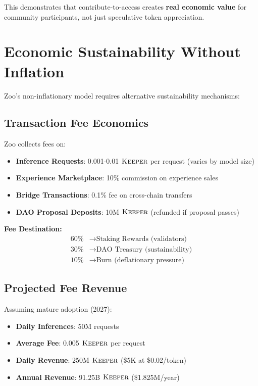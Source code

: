 \documentclass[11pt,letterpaper]{article}
\theoremstyle{definition}
\theoremstyle{remark}
\newcommand{\KEEPER}{\textsc{Keeper}}
\begin{document}
This demonstrates that contribute-to-access creates \textbf{real economic value} for community participants, not just speculative token appreciation.

\section{Economic Sustainability Without Inflation}

Zoo's non-inflationary model requires alternative sustainability mechanisms:

\subsection{Transaction Fee Economics}

Zoo collects fees on:
\begin{itemize}
\item \textbf{Inference Requests}: 0.001-0.01 $\KEEPER$ per request (varies by model size)
\item \textbf{Experience Marketplace}: 10\% commission on experience sales
\item \textbf{Bridge Transactions}: 0.1\% fee on cross-chain transfers
\item \textbf{DAO Proposal Deposits}: 10M $\KEEPER$ (refunded if proposal passes)
\end{itemize}

\textbf{Fee Destination:}
\begin{align}
60\% &\rightarrow \text{Staking Rewards (validators)} \\
30\% &\rightarrow \text{DAO Treasury (sustainability)} \\
10\% &\rightarrow \text{Burn (deflationary pressure)}
\end{align}

\subsection{Projected Fee Revenue}

Assuming mature adoption (2027):
\begin{itemize}
\item \textbf{Daily Inferences}: 50M requests
\item \textbf{Average Fee}: 0.005 $\KEEPER$ per request
\item \textbf{Daily Revenue}: 250M $\KEEPER$ (\$5K at \$0.02/token)
\item \textbf{Annual Revenue}: 91.25B $\KEEPER$ (\$1.825M/year)
\end{itemize}
\end{document}
